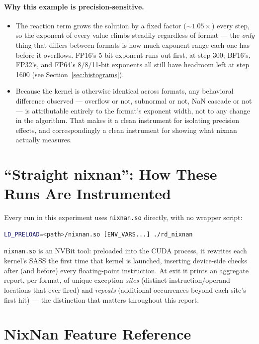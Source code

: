 \documentclass[11pt]{article}
\begin{document}
\paragraph{Why this example is precision-sensitive.}
\begin{itemize}
\item The reaction term grows the solution by a fixed factor (${\sim}1.05\times$) every
  step, so the exponent of every value climbs steadily regardless of format --- the
  \emph{only} thing that differs between formats is how much exponent range each one has
  before it overflows. FP16's 5-bit exponent runs out first, at step 300; BF16's,
  FP32's, and FP64's 8/8/11-bit exponents all still have headroom left at step 1600 (see
  Section~\ref{sec:histograms}).
\item Because the kernel is otherwise identical across formats, any behavioral
  difference observed --- overflow or not, subnormal or not, NaN cascade or not --- is
  attributable entirely to the format's exponent width, not to any change in the
  algorithm. That makes it a clean instrument for isolating precision effects, and
  correspondingly a clean instrument for showing what nixnan actually measures.
\end{itemize}

\section{``Straight nixnan'': How These Runs Are Instrumented}

Every run in this experiment uses \texttt{nixnan.so} directly, with no wrapper script:
\begin{lstlisting}[language=bash]
LD_PRELOAD=<path>/nixnan.so [ENV_VARS...] ./rd_nixnan
\end{lstlisting}
\texttt{nixnan.so} is an NVBit tool: preloaded into the CUDA process, it rewrites each
kernel's SASS the first time that kernel is launched, inserting device-side checks after
(and before) every floating-point instruction. At exit it prints an aggregate report,
per format, of unique exception \emph{sites} (distinct instruction/operand locations
that ever fired) and \emph{repeats} (additional occurrences beyond each site's first
hit) --- the distinction that matters throughout this report.

\section{NixNan Feature Reference}
\label{sec:reference}
\end{document}

